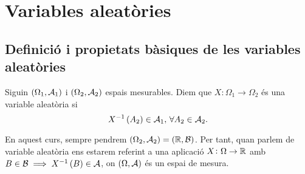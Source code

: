 \chapter{Variables aleatòries}

\section{Definició i propietats bàsiques de les variables aleatòries}

\begin{defi}
    Siguin $\left( \Omega_1, \mathcal{A}_1\right)$ i $\left( \Omega_2, \mathcal{A}_2\right)$ espais mesurables. Diem que $X\colon \Omega_1\to\Omega_2$ és una variable aleatòria si
    \[
        X^{-1}\left( A_2\right)\in\mathcal{A}_1,\,\forall A_2\in\mathcal{A}_2.
    \]
\end{defi}
\noindent En aquest curs, sempre pendrem $\left( \Omega_2, \mathcal{A}_2\right)=\left( \mathbb{R},\mathcal{B}\right)$. Per tant, quan parlem de variable aleatòria ens estarem referint a una aplicació $X\colon\Omega\to\mathbb{R}$ amb $B\in\mathcal{B}\implies X^{-1}\left( B\right)\in\mathcal{A}$, on $\left( \Omega, \mathcal{A}\right)$ és un espai de mesura.

